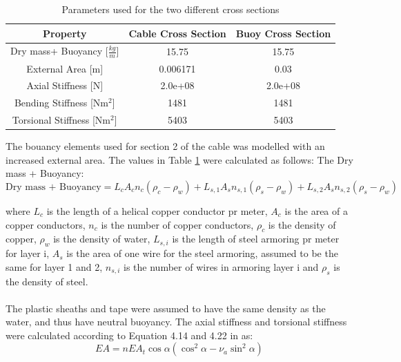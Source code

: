 \begin{table} [H]
\centering
\begin{tabular}{ |c|c|c|}
\hline
Property& Cable Cross Section & Buoy Cross Section \\
 \hline
 \hline
Dry mass+ Buoyancy [$\frac{kg}{m}$] & 15.75 & 15.75\\
External Area [m]& 0.006171 & 0.03\\
Axial Stiffness [N] & 2.0e+08 & 2.0e+08\\
Bending Stiffness [Nm$^2$] & 1481 & 1481\\
Torsional Stiffness [Nm$^2$] & 5403 & 5403\\
 \hline
\end{tabular}
\caption{Parameters used for the two different cross sections}
\label{table:crosssima}
\end{table}
\noindent The bouancy elements used for section 2 of the cable was modelled with an increased external area. The values in Table \ref{table:crosssima} were calculated as follows:\newline
\newline 
\noindent The Dry mass + Buoyancy: 
\begin{equation}
\text{Dry mass + Buoyancy}=L_{c} A_cn_c (\rho_c-\rho_w) + L_{s,1} A_{s}n_{s,1} (\rho_s-\rho_w)+L_{s,2} A_{s}n_{s,2} (\rho_s-\rho_w)
\end{equation}

\noindent where $L_c$ is the length of a helical copper conductor pr meter, $A_c$ is the area of a copper conductors, $n_c$ is the number of copper conductors, $\rho_c$ is the density of copper, $\rho_w$ is the density of water, $L_{s,i}$ is the length of steel armoring pr meter for layer i, $A_s$ is the area of one wire for the steel armoring, assumed to be the same for layer 1 and 2, $n_{s,i}$ is the number of wires in armoring layer i and $\rho_s$ is the density of steel.\\\\ The plastic sheaths and tape were assumed to have the same density as the water, and thus have neutral buoyancy. \newline
\newline 
The axial stiffness and torsional stiffness were calculated according to Equation 4.14 and 4.22 in \cite{Savik2016} as:
\begin{equation}
    EA=nEA_t \cos\alpha(\cos^2\alpha-\nu_a \sin^2\alpha)
\end{equation}

